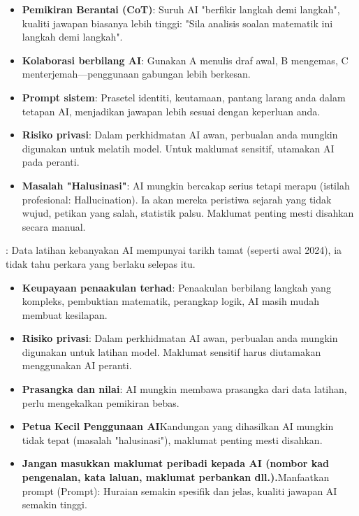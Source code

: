 \begin{itemize}
  \item \textbf{Pemikiran Berantai (CoT)}: Suruh AI "berfikir langkah demi langkah", kualiti jawapan biasanya lebih tinggi: "Sila analisis soalan matematik ini langkah demi langkah".
  \item \textbf{Kolaborasi berbilang AI}: Gunakan A menulis draf awal, B mengemas, C menterjemah—penggunaan gabungan lebih berkesan.
  \item \textbf{Prompt sistem}: Prasetel identiti, keutamaan, pantang larang anda dalam tetapan AI, menjadikan jawapan lebih sesuai dengan keperluan anda.
  \item \textbf{Risiko privasi}: Dalam perkhidmatan AI awan, perbualan anda mungkin digunakan untuk melatih model. Untuk maklumat sensitif, utamakan AI pada peranti.
  \item \textbf{Masalah "Halusinasi"}: AI mungkin bercakap serius tetapi merapu (istilah profesional: Hallucination). Ia akan mereka peristiwa sejarah yang tidak wujud, petikan yang salah, statistik palsu. Maklumat penting mesti disahkan secara manual.
\end{itemize}


: Data latihan kebanyakan AI mempunyai tarikh tamat (seperti awal 2024), ia tidak tahu perkara yang berlaku selepas itu.

\begin{itemize}
  \item \textbf{Keupayaan penaakulan terhad}: Penaakulan berbilang langkah yang kompleks, pembuktian matematik, perangkap logik, AI masih mudah membuat kesilapan.
  \item \textbf{Risiko privasi}: Dalam perkhidmatan AI awan, perbualan anda mungkin digunakan untuk latihan model. Maklumat sensitif harus diutamakan menggunakan AI peranti.
  \item \textbf{Prasangka dan nilai}: AI mungkin membawa prasangka dari data latihan, perlu mengekalkan pemikiran bebas.
  \item \textbf{Petua Kecil Penggunaan AI}Kandungan yang dihasilkan AI mungkin tidak tepat (masalah "halusinasi"), maklumat penting mesti disahkan.
  \item \textbf{Jangan masukkan maklumat peribadi kepada AI (nombor kad pengenalan, kata laluan, maklumat perbankan dll.).}Manfaatkan prompt (Prompt): Huraian semakin spesifik dan jelas, kualiti jawapan AI semakin tinggi.
\end{itemize}

